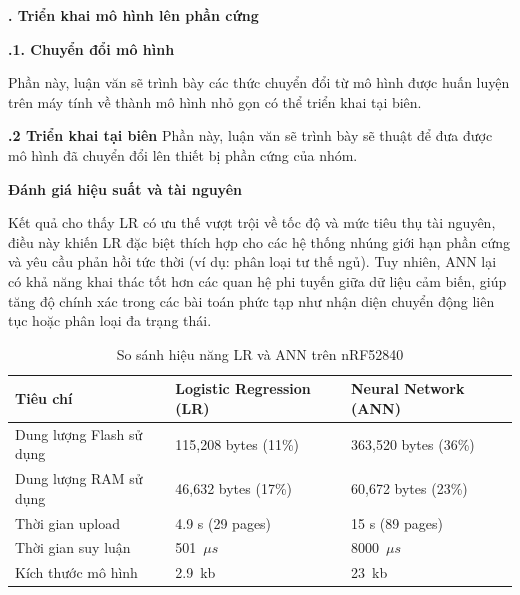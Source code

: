 \noindent\textbf{\fontsize{16}{20}. Triển khai mô hình lên phần cứng}

\noindent\textbf{\fontsize{14}{5}.1. Chuyển đổi mô hình}

Phần này, luận văn sẽ trình bày các thức chuyển đổi từ mô hình được huấn luyện
trên máy tính về thành mô hình nhỏ gọn có thể triển khai tại biên.

\noindent\textbf{\fontsize{14}{5}.2 Triển khai tại biên}
Phần này, luận văn sẽ trình bày sẽ thuật để đưa được mô hình đã chuyển đổi lên thiết bị phần cứng của nhóm.

\textbf{Đánh giá hiệu suất và tài nguyên}

Kết quả cho thấy LR có ưu thế vượt trội về tốc độ và mức tiêu thụ tài nguyên,
điều này khiến LR đặc biệt thích hợp cho các hệ thống nhúng giới hạn phần cứng
và yêu cầu phản hồi tức thời (ví dụ: phân loại tư thế ngủ). Tuy nhiên, ANN lại
có khả năng khai thác tốt hơn các quan hệ phi tuyến giữa dữ liệu cảm biến, giúp
tăng độ chính xác trong các bài toán phức tạp như nhận diện chuyển động liên
tục hoặc phân loại đa trạng thái.
\begin{table}[H]
    \centering
    \caption{So sánh hiệu năng LR và ANN trên nRF52840}
    \label{tab:comparison_full}
    \begin{tabular}{|l|p{5cm}|p{6cm}|}
        \hline
        \textbf{Tiêu chí}        & \textbf{Logistic Regression (LR)} & \textbf{Neural Network (ANN)} \\ \hline
        Dung lượng Flash sử dụng & 115,208 bytes (11\%)              & 363,520 bytes (36\%)          \\ \hline
        Dung lượng RAM sử dụng   & 46,632 bytes (17\%)               & 60,672 bytes (23\%)           \\ \hline
        Thời gian upload         & 4.9 s (29 pages)                  & 15 s (89 pages)               \\ \hline
        Thời gian suy luận       & 501~$\mu s$                       & 8000~$\mu s$                  \\ \hline
        Kích thước mô hình       & 2.9~kb                            & 23~kb                         \\ \hline

    \end{tabular}
\end{table}

